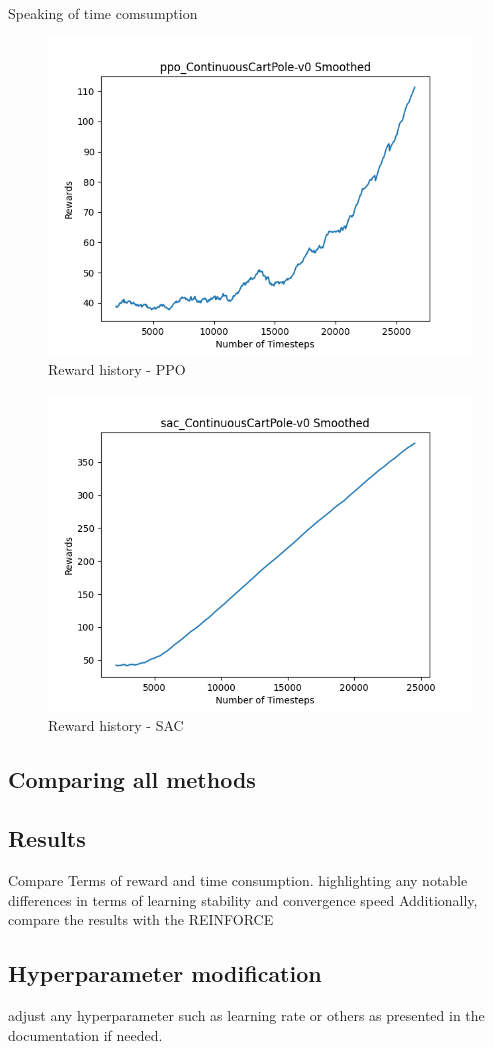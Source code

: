 \documentclass{article}
\begin{document}
Speaking of time comsumption

\begin{figure}[h]
	\centering
	\includegraphics[width=0.5\linewidth]{../data/plot/ppo_ContinuousCartPole-v0.png}
	\caption{Reward history - PPO}
	\label{fig:plot6}
\end{figure}


\begin{figure}[h]
	\centering
	\includegraphics[width=0.5\linewidth]{../data/plot/sac_ContinuousCartPole-v0.png}
	\caption{Reward history - SAC}
	\label{fig:plot7}
\end{figure}

\newpage

\subsection{Comparing all methods}


\subsection{Results}
Compare Terms of reward and time consumption.
highlighting any notable diﬀerences in terms of learning stability and convergence speed
Additionally, compare the results with the REINFORCE 

\subsection{Hyperparameter modification}
adjust any hyperparameter such as learning rate or others as presented in the documentation if
needed.



\end{document}
